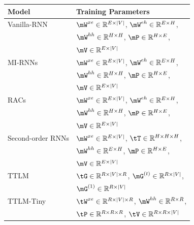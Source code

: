 \documentclass{article}
\theoremstyle{plain}
\theoremstyle{definition}
\theoremstyle{remark}
\begin{document}
\begin{table}[ht] \small
    \centering
    \begin{tabular}{ll}
    \toprule
        Model & Training Parameters \\
        \midrule
        Vanilla-RNN & $\mW^{xe}\in \mathbb{R}^{E\times |V|}$, $\mW^{eh}\in \mathbb{R}^{E\times H}$, \\ 
        & $\mW^{hh}\in \mathbb{R}^{H\times H}$, $\mP\in\mathbb{R}^{H\times E}$, \\
        & $\mV\in\mathbb{R}^{E\times|V|}$  \\
        \hline
        MI-RNNs & $\mW^{xe}\in \mathbb{R}^{E\times |V|}$, $\mW^{eh}\in \mathbb{R}^{E\times H}$, \\ 
        & $\mW^{hh}\in \mathbb{R}^{H\times H}$, $\mP\in\mathbb{R}^{H\times E}$, \\
        & $\mV\in\mathbb{R}^{E\times|V|}$  \\
       
        \hline
        RACs & $\mW^{xe}\in \mathbb{R}^{E\times |V|}$, $\mW^{eh}\in \mathbb{R}^{E\times H}$, \\
        & $\mW^{hh}\in \mathbb{R}^{H\times H}$, $\mP\in\mathbb{R}^{H\times E}$, \\
        & $\mV\in\mathbb{R}^{E\times|V|}$\\
        \hline
        Second-order RNNs & $\mW^{xe} \in \mathbb{R}^{E\times |V|}$, $\tT \in \mathbb{R}^{H\times H \times H}$, \\         
        & $\mW^{hh}\in \mathbb{R}^{E \times H}$, $\mP\in\mathbb{R}^{H\times E}$, \\
        & $\mV\in\mathbb{R}^{E\times|V|}$ \\
        \hline
        TTLM & $\tG\in \mathbb{R}^{R\times |V|\times R}$, $\mG^{(t)}\in \mathbb{R}^{R \times |V|}$, \\ 
        
        & $\mG^{(1)} \in \mathbb{R}^{R \times |V|}$ \\
        \hline
        TTLM-Tiny & $\tW^{xe}\in \mathbb{R}^{R\times |V| \times R}$, $\mW^{hh}\in\mathbb{R}^{R\times R}$, \\
        & $\tP\in\mathbb{R}^{R\times R\times R}$, $\tV\in\mathbb{R}^{R\times R\times |V|}$\\
        

\end{tabular}
\end{table}
\end{document}
